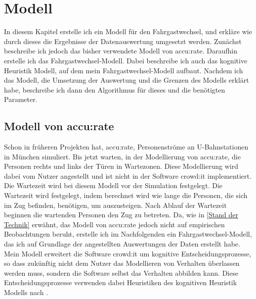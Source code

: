 \chapter{Modell} \label{Modell}
In diesem Kapitel erstelle ich ein Modell für den Fahrgastwechsel, und erkläre wie durch dieses die Ergebnisse der Datenauswertung umgesetzt werden. Zunächst beschreibe ich jedoch das bisher verwendete Modell von accu:rate. Daraufhin erstelle ich das Fahrgastwechsel-Modell. Dabei beschreibe ich auch das kognitive Heuristik Modell, auf dem mein Fahrgastwechsel-Modell aufbaut. Nachdem ich das Modell, die Umsetzung der Auswertung und die Grenzen des Modells erklärt habe, beschreibe ich dann den Algorithmus für dieses und die benötigten Parameter.
\section{Modell von accu:rate} \label{Accurate Modell}
Schon in früheren Projekten hat, accu:rate, Personenströme an U-Bahnstationen in München simuliert. Bis jetzt warten, in der Modellierung von accu:rate, die Personen rechts und links der Türen in Wartezonen. Diese Modellierung wird dabei vom Nutzer angestellt und ist nicht in der Software crowd:it implementiert. Die Wartezeit wird bei diesem Modell vor der Simulation festgelegt. Die Wartezeit wird festgelegt, indem berechnet wird wie lange die Personen, die sich im Zug befinden, benötigen, um auszusteigen. Nach Ablauf der Wartezeit beginnen die wartenden Personen den Zug zu betreten. Da, wie in \ref{Stand der Technik} erwähnt, das Modell von accu:rate jedoch nicht auf empirischen Beobachtungen beruht, erstelle ich im Nachfolgenden ein Fahrgastwechsel-Modell, das ich auf Grundlage der angestellten Auswertungen der Daten erstellt habe. Mein Modell erweitert die Software crowd:it um kognitive Entscheidungsprozesse, so dass zukünftig nicht dem Nutzer das Modellieren von Verhalten überlassen werden muss, sondern die Software selbst das Verhalten abbilden kann. Diese Entscheidungsprozesse verwenden dabei Heuristiken des kognitiven Heuristik Modells nach \cite{Seitz.2016}. 
